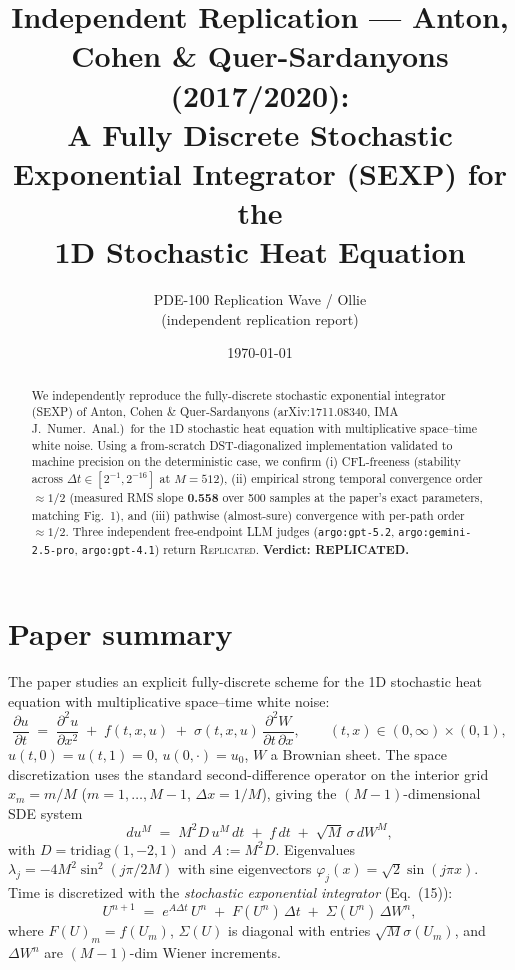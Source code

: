 \documentclass[11pt]{article}
\title{Independent Replication --- Anton, Cohen \& Quer-Sardanyons (2017/2020):\\
A Fully Discrete Stochastic Exponential Integrator (SEXP) for the\\
1D Stochastic Heat Equation}
\author{PDE-100 Replication Wave / Ollie \\ \small (independent replication report)}
\date{\today}
\begin{document}
\maketitle

\begin{abstract}
We independently reproduce the fully-discrete stochastic exponential integrator (SEXP) of
Anton, Cohen \& Quer-Sardanyons (arXiv:1711.08340, IMA J.\ Numer.\ Anal.)\ for the 1D
stochastic heat equation with multiplicative space--time white noise. Using a from-scratch
DST-diagonalized implementation validated to machine precision on the deterministic case,
we confirm (i) CFL-freeness (stability across
$\Delta t \in [2^{-1},2^{-16}]$ at $M=512$), (ii) empirical strong temporal convergence
order $\approx 1/2$ (measured RMS slope \textbf{0.558} over 500 samples at the paper's exact
parameters, matching Fig.~1), and (iii) pathwise (almost-sure) convergence with per-path
order $\approx 1/2$. Three independent free-endpoint LLM judges (\texttt{argo:gpt-5.2},
\texttt{argo:gemini-2.5-pro}, \texttt{argo:gpt-4.1}) return \textsc{Replicated}.
\textbf{Verdict: REPLICATED.}
\end{abstract}

\section{Paper summary}

The paper studies an explicit fully-discrete scheme for the 1D stochastic heat equation
with multiplicative space--time white noise:
\begin{equation}
  \frac{\partial u}{\partial t} \;=\; \frac{\partial^2 u}{\partial x^2}
    \;+\; f(t,x,u) \;+\; \sigma(t,x,u)\,\frac{\partial^2 W}{\partial t\,\partial x},
    \qquad (t,x)\in(0,\infty)\times(0,1),
\end{equation}
$u(t,0)=u(t,1)=0$, $u(0,\cdot)=u_0$, $W$ a Brownian sheet. The space discretization uses
the standard second-difference operator on the interior grid $x_m=m/M$
($m=1,\dots,M-1$, $\Delta x = 1/M$), giving the $(M-1)$-dimensional SDE system
\[
  du^M \;=\; M^2 D\,u^M\,dt \;+\; f\,dt \;+\; \sqrt{M}\,\sigma\,dW^M,
\]
with $D = \mathrm{tridiag}(1,-2,1)$ and $A := M^2 D$. Eigenvalues
$\lambda_j = -4M^2\sin^2(j\pi/2M)$ with sine eigenvectors $\varphi_j(x)=\sqrt{2}\sin(j\pi x)$.
Time is discretized with the \emph{stochastic exponential integrator} (Eq.\ (15)):
\begin{equation}
  U^{n+1} \;=\; e^{A\Delta t}\,U^n \;+\; F(U^n)\,\Delta t \;+\; \Sigma(U^n)\,\Delta W^n,
  \label{eq:sexp}
\end{equation}
where $F(U)_m=f(U_m)$, $\Sigma(U)$ is diagonal with entries $\sqrt{M}\sigma(U_m)$, and
$\Delta W^n$ are $(M-1)$-dim Wiener increments.
\end{document}
